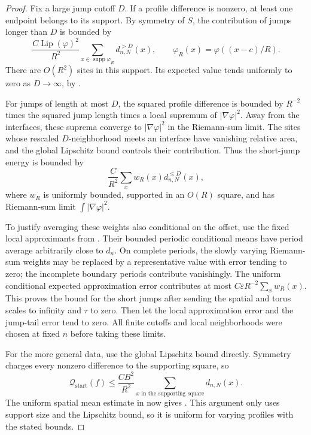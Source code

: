 \begin{proof}
Fix a large jump cutoff $D$. If a profile difference is nonzero,
at least one endpoint belongs to its support. By symmetry of $S$,
the contribution of jumps longer than $D$ is bounded by
\[
 \frac{C\operatorname{Lip}(\varphi)^2}{R^2}
       \sum_{x\in\operatorname{supp}\varphi_R}
                    d_{n,N}^{>D}(x),
 \qquad \varphi_R(x)=\varphi((x-c)/R).
\]
There are $O(R^2)$ sites in this support. Its expected value tends
uniformly to zero as $D\to\infty$, by
.

For jumps of length at most $D$, the squared profile difference is
bounded by $R^{-2}$ times the squared jump length times a local
supremum of $|\nabla\varphi|^2$. Away from the interfaces, these
suprema converge to $|\nabla\varphi|^2$ in the Riemann-sum limit.
The sites whose rescaled $D$-neighborhood meets an interface have
vanishing relative area, and the global Lipschitz bound controls
their contribution. Thus the short-jump energy is bounded by
\[
 \frac{C}{R^2}\sum_x w_R(x)d_{n,N}^{\leq D}(x),
\]
where $w_R$ is uniformly bounded, supported in an $O(R)$ square,
and has Riemann-sum limit $\int|\nabla\varphi|^2$.

To justify averaging these weights also conditional on the offset,
use the fixed local approximants from
. Their bounded periodic conditional
means have period average arbitrarily close to $d_n$.
On complete periods, the slowly varying Riemann-sum weights may be
replaced by a representative value with error tending to zero;
the incomplete boundary periods contribute vanishingly. The
uniform conditional expected approximation error contributes at
most $C\varepsilon R^{-2}\sum_x w_R(x)$.
This proves the bound for the short jumps after sending the spatial
and torus scales to infinity and $\tau$ to zero. Then let the local
approximation error and the jump-tail error tend to zero. All
finite cutoffs and local neighborhoods were chosen at fixed $n$
before taking these limits.

For the more general data, use the global Lipschitz bound directly.
Symmetry charges every nonzero difference to the supporting square,
so
\[
 \mathcal Q_{\mathrm{start}}(f)
 \leq \frac{CB^2}{R^2}
      \sum_{x\text{ in the supporting square}}d_{n,N}(x).
\]
The uniform spatial mean estimate in  now gives
. This argument only uses support size
and the Lipschitz bound, so it is uniform for varying profiles with
the stated bounds.
\end{proof}

